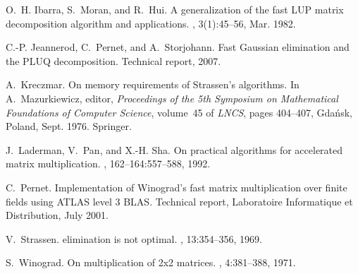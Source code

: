 \documentclass{article}
\begin{document}
\begin{thebibliography}{10}
O.~H. Ibarra, S.~Moran, and R.~Hui.
\newblock A generalization of the fast {LUP} matrix decomposition algorithm and
  applications.
, 3(1):45--56, Mar. 1982.

C.-P. Jeannerod, C.~Pernet, and A.~Storjohann.
\newblock Fast {Gaussian} elimination and the {PLUQ} decomposition.
\newblock Technical report, 2007.

A.~Kreczmar.
\newblock On memory requirements of {Strassen}'s algorithms.
\newblock In A.~Mazurkiewicz, editor, {\em Proceedings of the 5th Symposium on
  Mathematical Foundations of Computer Science}, volume~45 of {\em LNCS}, pages
  404--407, Gda{\'n}sk, Poland, Sept. 1976. Springer.

J.~Laderman, V.~Pan, and X.-H. Sha.
\newblock On practical algorithms for accelerated matrix multiplication.
, 162--164:557--588, 1992.

C.~Pernet.
\newblock Implementation of {Winograd}'s fast matrix multiplication over finite
  fields using {ATLAS} level 3 {BLAS}.
\newblock Technical report, Laboratoire Informatique et Distribution, July
  2001.

V.~Strassen.
 elimination is not optimal.
, 13:354--356, 1969.

S.~Winograd.
\newblock On multiplication of 2x2 matrices.
, 4:381--388, 1971.

\end{thebibliography}
\end{document}
